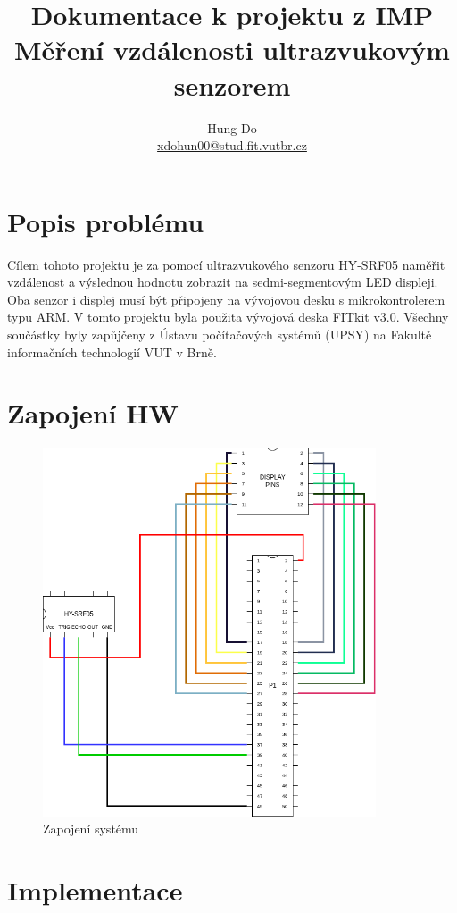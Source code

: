 \documentclass[a4paper,11pt]{article}
\title{Dokumentace k projektu z IMP \\
        \large Měření vzdálenosti ultrazvukovým senzorem}
\author{Hung Do \\ \href{mailto:xdohun00@stud.fit.vutbr.cz}{xdohun00@stud.fit.vutbr.cz}}
\begin{document}
    \maketitle
    \thispagestyle{empty}
    \newpage
    \tableofcontents
    \newpage
    \section{Popis problému}
    Cílem tohoto projektu je za pomocí ultrazvukového senzoru HY-SRF05 naměřit vzdálenost a výslednou hodnotu zobrazit na 
    sedmi-segmentovým LED displeji. Oba senzor i displej musí být připojeny na vývojovou desku s mikrokontrolerem typu ARM.
    V tomto projektu byla použita vývojová deska FITkit v3.0. Všechny součástky byly zapůjčeny z Ústavu počítačových systémů (UPSY) na 
    Fakultě informačních technologií VUT v Brně.

    \section{Zapojení HW}
    \label{sec:circuit_diagram}
    \begin{figure}[ht!]
        \centering
        \includegraphics[width=280pt]{circuit}
        \caption{Zapojení systému}
    \end{figure}

    \section{Implementace}
\end{document}
